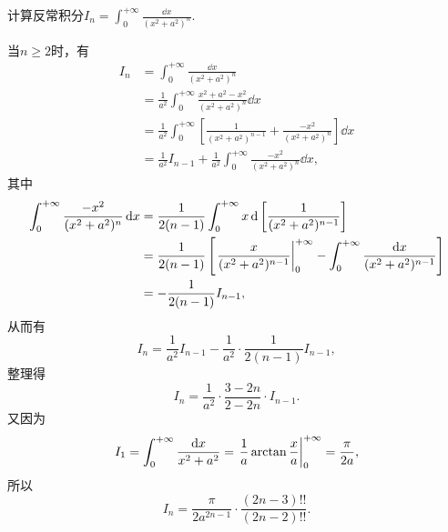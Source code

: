 \begin{example}
计算反常积分\(I_n = \int_0^{+\infty} \frac{\dd{x}}{(x^2+a^2)^n}\).
\begin{solution}
当\(n\geq2\)时，有\begin{align*}
	I_n &= \int_0^{+\infty} \frac{\dd{x}}{(x^2+a^2)^n} \\
	&= \frac1{a^2} \int_0^{+\infty} \frac{x^2+a^2-x^2}{(x^2+a^2)^n} \dd{x} \\
	&= \frac1{a^2} \int_0^{+\infty} \left[
		\frac1{(x^2+a^2)^{n-1}}
		+ \frac{-x^2}{(x^2+a^2)^n}
	\right] \dd{x} \\
	&= \frac1{a^2} I_{n-1}
		+ \frac1{a^2} \int_0^{+\infty} \frac{-x^2}{(x^2+a^2)^n} \dd{x},
\end{align*}
其中\begin{align*}
	\int_0^{+\infty} \frac{-x^2}{(x^2+a^2)^n} \dd{x}
	&= \frac1{2(n-1)} \int_0^{+\infty} x \dd{\left[\frac1{(x^2+a^2)^{n-1}}\right]} \\
	&= \frac1{2(n-1)} \left[
		\eval{\frac{x}{(x^2+a^2)^{n-1}}}_0^{+\infty}
		- \int_0^{+\infty} \frac{\dd{x}}{(x^2+a^2)^{n-1}}
	\right] \\
	&= -\frac1{2(n-1)} I_{n-1},
\end{align*}
从而有\[
	I_n = \frac1{a^2} I_{n-1} - \frac1{a^2} \cdot \frac1{2(n-1)} I_{n-1},
\]
整理得\[
	I_n = \frac1{a^2} \cdot \frac{3-2n}{2-2n} \cdot I_{n-1}.
\]
又因为\[
	I_1 = \int_0^{+\infty} \frac{\dd{x}}{x^2+a^2}
	= \eval{\frac1a \arctan\frac{x}{a}}_0^{+\infty}
	= \frac\pi{2a},
\]
所以\[
	I_n = \frac\pi{2a^{2n-1}} \cdot \frac{(2n-3)!!}{(2n-2)!!}.
\]
\end{solution}
\end{example}

